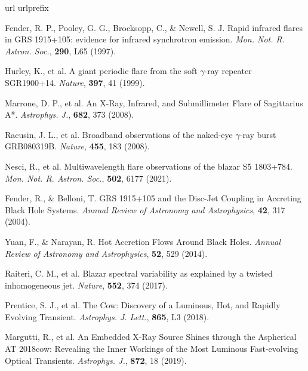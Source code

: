 \documentclass{nature_plusfigure}
\newcommand{\mn}{{Mon. Not. R. Astron. Soc.}}
\newcommand{\mnras}{\mn}
\newcommand{\apj}{{Astrophys. J.}}
\newcommand{\apjl}{{Astrophys. J. Lett.}}
\newcommand{\nat}{{Nature}}
\newcommand{\araa}{Annual Review of Astronomy and Astrophysics}
\begin{document}
\clearpage


%
%

\begin{thebibliography}{100}
\expandafter\ifx\csname url\endcsname\relax
  \def\url#1{\texttt{#1}}\fi
\expandafter\ifx\csname urlprefix\endcsname\relax\def\urlprefix{URL }\fi
\providecommand{\bibinfo}[2]{#2}
\providecommand{\eprint}[2][]{\url{#2}}



 Fender, R. P., Pooley, G. G., Brocksopp, C., \& Newell, S. J. Rapid infrared flares in GRS 1915+105: evidence for infrared synchrotron emission. \emph{\mnras}, \textbf{290}, L65 (1997). 

 Hurley, K., et al. A giant periodic flare from the soft $\gamma$-ray repeater SGR1900+14. \emph{\nat}, \textbf{397}, 41 (1999). 

 Marrone, D. P., et al. An X-Ray, Infrared, and Submillimeter Flare of Sagittarius A*. \emph{\apj}, \textbf{682}, 373 (2008). 

 Racusin, J. L., et al. Broadband observations of the naked-eye $\gamma$-ray burst GRB080319B. \emph{\nat}, \textbf{455}, 183 (2008). 

 Nesci, R., et al. Multiwavelength flare observations of the blazar S5 1803+784. \emph{\mnras}, \textbf{502}, 6177 (2021). 

 Fender, R., \& Belloni, T. GRS 1915+105 and the Disc-Jet Coupling in Accreting Black Hole Systems. \emph{\araa}, \textbf{42}, 317 (2004). 

 Yuan, F., \& Narayan, R. Hot Accretion Flows Around Black Holes. \emph{\araa}, \textbf{52}, 529 (2014). 

 Raiteri, C. M., et al. Blazar spectral variability as explained by a twisted inhomogeneous jet. \emph{\nat}, \textbf{552}, 374 (2017). 

 Prentice, S. J., et al. The Cow: Discovery of a Luminous, Hot, and Rapidly Evolving Transient. \emph{\apjl}, \textbf{865}, L3 (2018). 

 Margutti, R., et al. An Embedded X-Ray Source Shines through the Aspherical AT 2018cow: Revealing the Inner Workings of the Most Luminous Fast-evolving Optical Transients. \emph{\apj}, \textbf{872}, 18 (2019). 


\end{thebibliography}
\end{document}
